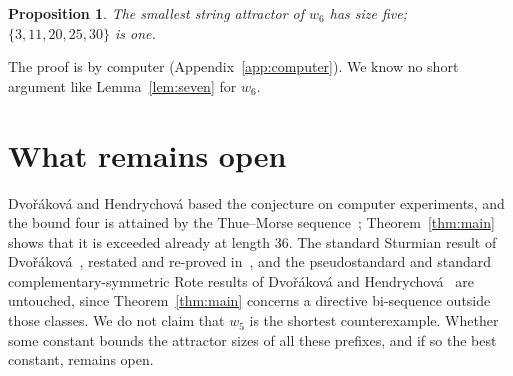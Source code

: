 \documentclass[11pt]{article}
\newtheorem{proposition}[theorem]{Proposition}
\theoremstyle{remark}
\begin{document}
\begin{proposition}\label{prop:second}
The smallest string attractor of $w_6$ has size five; $\{3,11,20,25,30\}$ is
one.
\end{proposition}

\noindent The proof is by computer (Appendix~\ref{app:computer}). We know no
short argument like Lemma~\ref{lem:seven} for $w_6$.

\section{What remains open}\label{sec:open}

Dvořáková and Hendrychová based the conjecture on computer experiments, and
the bound four is attained by the Thue--Morse sequence~\cite{kutsukake};
Theorem~\ref{thm:main} shows that it is exceeded already at length $36$.
The standard Sturmian result of Dvořáková~\cite{d-epi}, restated and
re-proved in~\cite{dh}, and the pseudostandard and standard
complementary-symmetric Rote results of Dvořáková and
Hendrychová~\cite{dh} are untouched, since
Theorem~\ref{thm:main} concerns a directive bi-sequence outside those
classes. We do not claim that $w_5$ is the shortest counterexample. Whether
some constant bounds the attractor sizes of all these prefixes, and if so the
best constant, remains open.
\end{document}
